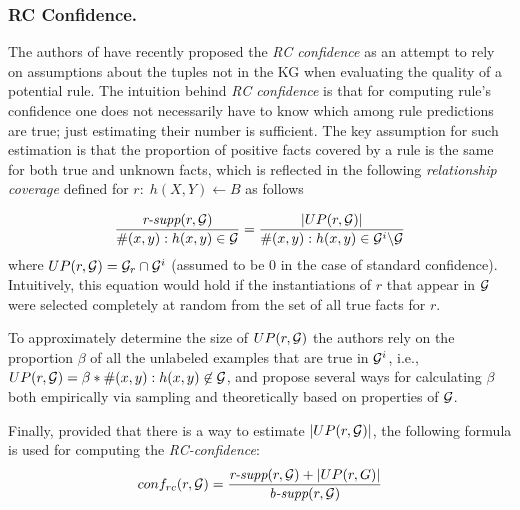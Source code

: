 \subsubsection{RC Confidence.} %
The authors of \cite{DBLP:conf/www/ZupancD18} have recently proposed the \emph{RC confidence} as an attempt to rely on assumptions about the tuples not in the KG when evaluating the quality of a potential rule. %
The intuition behind \emph{RC confidence} is that for computing rule's confidence one does not necessarily have to know which among rule predictions are true; just estimating their number is sufficient. The key assumption for such estimation is that the proportion of positive facts covered by a rule is the same for both true and unknown facts, which is reflected in the following \emph{relationship coverage} defined for $r:\;h(X,Y)\leftarrow B$ as follows

\[\frac{\textit{r-supp}(r,\mathcal{G})}{\#(x,y):h(x,y) \in  \mathcal{G}} = \frac{|UP(r,\mathcal{G})|}{\#(x,y):h(x,y) \in \mathcal{G}^i\backslash \mathcal{G}}\]
where $UP(r,\mathcal{G})=\mathcal{G}_r \cap \mathcal{G}^i$ (assumed to be 0 in the case of standard confidence).
Intuitively, this equation would hold if the instantiations of $r$ that appear in $\mathcal{G}$ were selected completely at random \cite{DBLP:conf/kdd/ElkanN08} from the set of all true facts for $r$.


To approximately determine the size of $UP(r,\mathcal{G})$ the authors rely on the proportion $\beta$ of all the unlabeled examples
that are true in $\mathcal{G}^i$, i.e., $UP(r,\mathcal{G})=\beta*\#(x,y):h(x,y)\not \in \mathcal{G}$, and propose several ways for calculating $\beta$ both empirically via sampling and theoretically based on properties of $\mathcal{G}$.

Finally, provided that there is a way to estimate $|UP(r,\mathcal{G})|$, the following formula is used for computing the \emph{RC-confidence}:
\[
conf_{rc}(r,\mathcal{G}) = \frac{\textit{r-supp}(r,\mathcal{G}) + |UP(r,G)|}{\textit{b-supp}(r,\mathcal{G})}
\]


